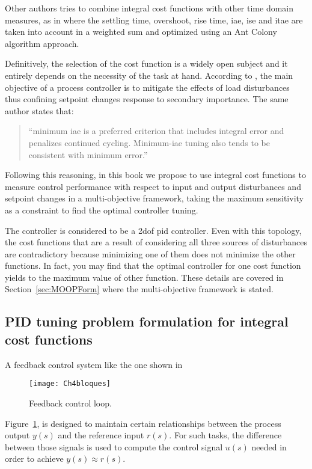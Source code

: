 Other authors tries to combine integral cost functions with other time domain measures, as in \citet{Chiha2012} where the settling time, overshoot, rise time, \gls{iae}, \gls{ise} and \gls{itae} are taken into account in a weighted sum and optimized using an Ant Colony algorithm approach.

Definitively, the selection of the cost function is a widely open subject and it entirely depends on the necessity of the task at hand. According to \citet{Shinskey2002}, the main objective of a process controller is to mitigate the effects of load disturbances thus confining setpoint changes response to secondary importance. The same author states that: \begin{quote}
	``minimum \gls{iae} is a preferred criterion that includes integral error and penalizes continued cycling. Minimum-\gls{iae} tuning also tends to be consistent with minimum error.''
\end{quote}
%

Following this reasoning, in this book we propose to use integral cost functions to measure control performance with respect to input and output disturbances and setpoint changes in a multi-objective framework, taking the maximum sensitivity as a constraint to find the optimal controller tuning.

The controller is considered to be a \gls{2dof} \gls{pid} controller. Even with this topology, the cost functions that are a result of considering all three sources of disturbances are contradictory because minimizing one of them does not minimize the other functions. In fact, you may find that the optimal controller for one cost function yields to the maximum value of other function. These details are covered in Section~\ref{sec:MOOPForm} where the multi-objective framework is stated.

\subsection{PID tuning problem formulation for integral cost functions}
\label{sec:CostProbPID}
A feedback control system like the one shown in %
\begin{figure}[b]
	\centering
	\texttt{[image: Ch4bloques]}%
	\caption{Feedback control loop.}%
	\label{fig:bloques}%
\end{figure}
%
Figure~\ref{fig:bloques}, is designed to maintain certain relationships between the process output $y(s)$ and the reference input $r(s)$. For such tasks, the difference between those signals is used to compute the control signal $u(s)$ needed in order to achieve $y(s) \approx r(s)$. 

